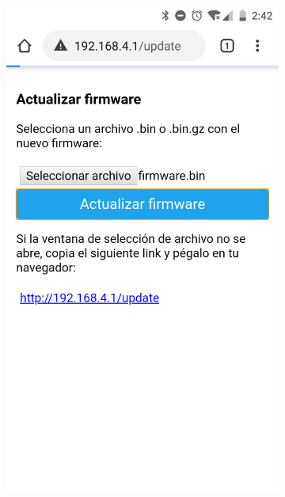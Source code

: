 \begin{figure}
\begin{subfigure}{0.32\columnwidth}
  \includegraphics[width=1\columnwidth,frame]{images/interior-firmware-update-chrome}
  \caption{}
  \label{fig:interior-firmware-update-chrome}
\end{subfigure}
\hfill
\begin{subfigure}{0.32\columnwidth}
  \centering

\end{subfigure}
\end{figure}
